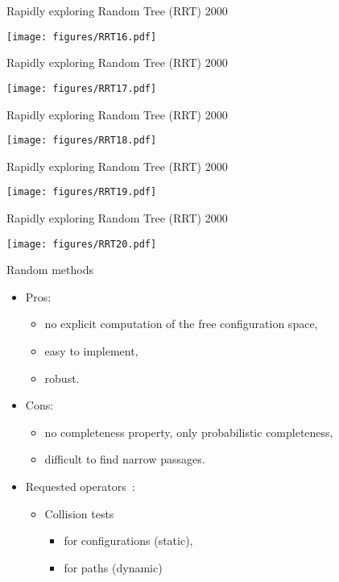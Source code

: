\begin{frame} {Rapidly exploring Random Tree (RRT) 2000}
\centerline {
  \texttt{[image: figures/RRT16.pdf]}
}
\end{frame}

\begin{frame} {Rapidly exploring Random Tree (RRT) 2000}
\centerline {
  \texttt{[image: figures/RRT17.pdf]}
}
\end{frame}

\begin{frame} {Rapidly exploring Random Tree (RRT) 2000}
\centerline {
  \texttt{[image: figures/RRT18.pdf]}
}
\end{frame}

\begin{frame} {Rapidly exploring Random Tree (RRT) 2000}
\centerline {
  \texttt{[image: figures/RRT19.pdf]}
}
\end{frame}

\begin{frame} {Rapidly exploring Random Tree (RRT) 2000}
\centerline {
  \texttt{[image: figures/RRT20.pdf]}
}
\end{frame}

%
%

\begin{frame} {Random methods}
  \begin{itemize}
  \item Pros:
    \begin{itemize}
    \item no explicit computation of the free configuration space,
    \item easy to implement,
    \item robust.
    \end{itemize}
    \pause
  \item Cons:
    \begin{itemize}
    \item no completeness property, only probabilistic completeness,
    \item difficult to find narrow passages.
    \end{itemize}
    \pause
  \item Requested operators~:
    \begin{itemize}
    \item Collision tests
      \begin{itemize}
      \item for configurations (static),
      \item for paths (dynamic)
      \end{itemize}
    \end{itemize}
  \end{itemize}
\end{frame}

